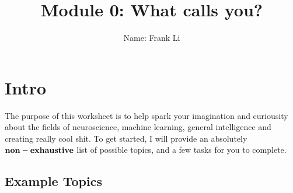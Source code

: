\documentclass[letterpaper,11pt]{article}
\begin{document}
\title{{\bf Module 0: What calls you?} }
\author{Name: Frank Li}

\date{}
\maketitle

\section{Intro}
The purpose of this worksheet is to help spark your imagination and curiousity about the fields of neuroscience, machine learning, general intelligence and creating really cool shit. To get started, I will provide an absolutely $\bf{non-exhaustive}$ list of possible topics, and a few tasks for you to complete.

\subsection{Example Topics}
\end{document}
